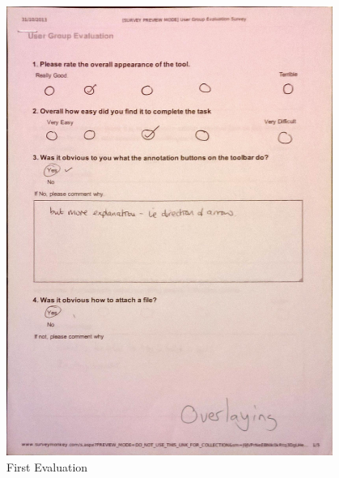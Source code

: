 \begin{figure}[h!]
    \centering
    \includegraphics[width=0.95\textwidth]{images/user_eval/user_eval_5.jpg}
    \caption{First Evaluation}
\end{figure}

